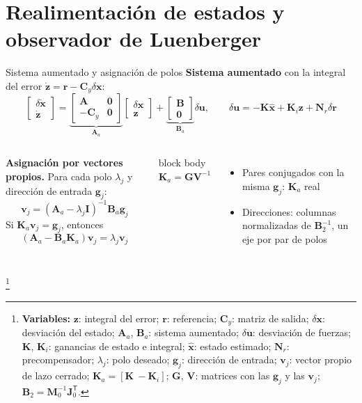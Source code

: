 \documentclass[aspectratio=169,10pt]{beamer}
\newcommand{\vect}[1]{\bm{#1}}
\newcommand{\T}{^{\mathsf{T}}}
\newcommand{\variables}[1]{\begingroup\renewcommand{\thefootnote}{}\footnote[frame]{\textbf{Variables:} #1}\addtocounter{footnote}{-1}\endgroup}
\newcommand{\resultado}[1]{\par\smallskip\begin{beamercolorbox}[rounded=true,sep=0.45em,center]{block body}#1\end{beamercolorbox}\par\smallskip}
\begin{document}
\section{Realimentación de estados y observador de Luenberger}

\begin{frame}{Sistema aumentado y asignación de polos}
\small
\textbf{Sistema aumentado} con la integral del error $\dot{\vect z} = \vect r - \vect C_y\delta\vect x$:
\[
\begin{bmatrix}\delta\dot{\vect x}\\ \dot{\vect z}\end{bmatrix} = \underbrace{\begin{bmatrix}\vect A & \vect 0\\ -\vect C_y & \vect 0\end{bmatrix}}_{\vect A_a}\begin{bmatrix}\delta\vect x\\ \vect z\end{bmatrix} + \underbrace{\begin{bmatrix}\vect B\\ \vect 0\end{bmatrix}}_{\vect B_a}\delta\vect u,\qquad
\delta\vect u = -\vect K\hat{\vect x} + \vect K_i\vect z + \vect N_r\delta\vect r
\]
\begin{columns}[T]
\textbf{Asignación por vectores propios.} Para cada polo $\lambda_j$ y dirección de entrada $\vect g_j$:
\[
\vect v_j = (\vect A_a - \lambda_j\vect I)^{-1}\vect B_a\vect g_j
\]
Si $\vect K_a\vect v_j = \vect g_j$, entonces
\[
(\vect A_a - \vect B_a\vect K_a)\vect v_j = \lambda_j\vect v_j
\]
\resultado{$\vect K_a = \vect G\vect V^{-1}$}
\begin{itemize}
\setlength{\itemsep}{0.2em}
\item Pares conjugados con la misma $\vect g_j$: $\vect K_a$ real
\item Direcciones: columnas normalizadas de $\vect B_2^{-1}$, un eje por par de polos
\end{itemize}
\end{columns}
\variables{$\vect z$: integral del error; $\vect r$: referencia; $\vect C_y$: matriz de salida; $\delta\vect x$: desviación del estado; $\vect A_a$, $\vect B_a$: sistema aumentado; $\delta\vect u$: desviación de fuerzas; $\vect K$, $\vect K_i$: ganancias de estado e integral; $\hat{\vect x}$: estado estimado; $\vect N_r$: precompensador; $\lambda_j$: polo deseado; $\vect g_j$: dirección de entrada; $\vect v_j$: vector propio de lazo cerrado; $\vect K_a = [\vect K\ -\vect K_i]$; $\vect G$, $\vect V$: matrices con las $\vect g_j$ y las $\vect v_j$; $\vect B_2 = \vect M_0^{-1}\vect J_0\T$.}
\end{frame}
\end{document}
